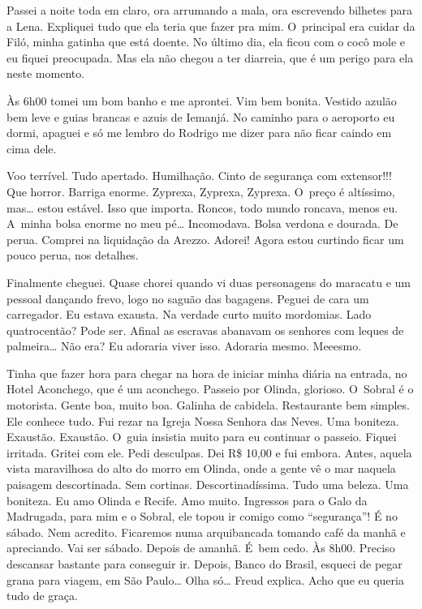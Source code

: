 Passei a noite toda em claro, ora arrumando a mala, ora escrevendo
bilhetes para a Lena. Expliquei tudo que ela teria que fazer pra mim. O~principal era cuidar da Filó, minha gatinha que está doente. No último
dia, ela ficou com o cocô mole e eu fiquei preocupada. Mas ela não
chegou a ter diarreia, que é um perigo para ela neste momento.

Às 6h00 tomei um bom banho e me aprontei. Vim bem bonita. Vestido azulão
bem leve e guias brancas e azuis de Iemanjá. No caminho para o aeroporto
eu dormi, apaguei e só me lembro do Rodrigo me dizer para não ficar
caindo em cima dele.

Voo terrível. Tudo apertado. Humilhação. Cinto de segurança com
extensor!!! Que horror. Barriga enorme. Zyprexa, Zyprexa, Zyprexa. O~preço é altíssimo, mas… estou estável. Isso que importa. Roncos,
todo mundo roncava, menos eu. A~minha bolsa enorme no meu pé…
Incomodava. Bolsa verdona e dourada. De perua. Comprei na liquidação da
Arezzo. Adorei! Agora estou curtindo ficar um pouco perua, nos detalhes.

Finalmente cheguei. Quase chorei quando vi duas personagens do maracatu
e um pessoal dançando frevo, logo no saguão das bagagens. Peguei de cara
um carregador. Eu estava exausta. Na verdade curto muito mordomias. Lado
quatrocentão? Pode ser. Afinal as escravas abanavam os senhores com
leques de palmeira… Não era? Eu adoraria viver isso. Adoraria
mesmo. Meeesmo.

Tinha que fazer hora para chegar na hora de iniciar minha diária na
entrada, no Hotel Aconchego, que é um aconchego. Passeio por Olinda,
glorioso. O~Sobral é o motorista. Gente boa, muito boa. Galinha de
cabidela. Restaurante bem simples. Ele conhece tudo. Fui rezar na Igreja
Nossa Senhora das Neves. Uma boniteza. Exaustão. Exaustão. O~guia
insistia muito para eu continuar o passeio. Fiquei irritada. Gritei com
ele. Pedi desculpas. Dei R\$ 10,00 e fui embora. Antes, aquela vista
maravilhosa do alto do morro em Olinda, onde a gente vê o mar naquela
paisagem descortinada. Sem cortinas. Descortinadíssima. Tudo uma beleza.
Uma boniteza. Eu amo Olinda e Recife. Amo muito. Ingressos para o Galo
da Madrugada, para mim e o Sobral, ele topou ir comigo como
``segurança''! É no sábado. Nem acredito. Ficaremos numa arquibancada
tomando café da manhã e apreciando. Vai ser sábado. Depois de amanhã. É~bem cedo. Às 8h00. Preciso descansar bastante para conseguir ir. Depois,
Banco do Brasil, esqueci de pegar grana para viagem, em São
Paulo… Olha só… Freud explica. Acho que eu queria tudo de
graça.

